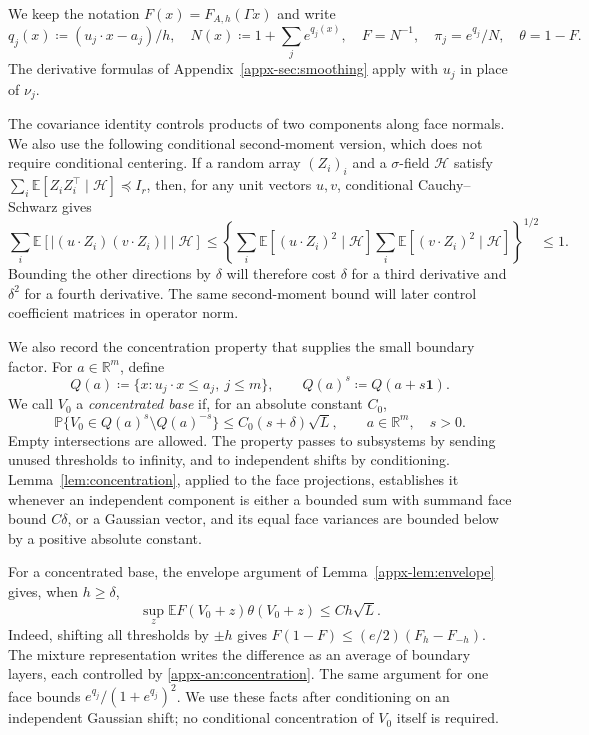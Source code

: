 \documentclass[11pt,letterpaper]{article}
\theoremstyle{remark}
\newcommand{\E}{\mathbb E}
\newcommand{\Pp}{\mathbb P}
\newcommand{\R}{\mathbb R}
\begin{document}
We keep the notation \(F(x)=F_{A,h}(\Gamma x)\) and write
\[
 q_j(x)\coloneqq (u_j\cdot x-a_j)/h,\quad N(x)\coloneqq 1+\sum_j e^{q_j(x)},\quad
 F=N^{-1},\quad \pi_j=e^{q_j}/N,\quad\theta=1-F.
\]
The derivative formulas of Appendix~\ref{appx-sec:smoothing} apply
with \(u_j\) in place of \(\nu_j\).

The covariance identity controls products of two components along face normals.
We also use the following conditional second-moment version, which
does not require conditional centering. If a random array \((Z_i)_i\)
and a \(\sigma\)-field \(\mathcal H\) satisfy
\(\sum_i\E[Z_iZ_i^\top\mid\mathcal H]\preceq I_r\), then, for
any unit vectors \(u,v\), conditional Cauchy--Schwarz gives
\begin{equation}
 \sum_i\E[|(u\cdot Z_i)(v\cdot Z_i)|\mid\mathcal H]
 \le\left\{\sum_i\E[(u\cdot Z_i)^2\mid\mathcal H]
           \sum_i\E[(v\cdot Z_i)^2\mid\mathcal H]\right\}^{1/2}
 \le1.
 \label{appx-an:pair-contraction}
\end{equation}
Bounding the other directions by \(\delta\) will therefore cost
\(\delta\) for a third derivative and \(\delta^2\) for a fourth
derivative. The same second-moment bound will later control coefficient
matrices in operator norm.

We also record the concentration property that supplies the small
boundary factor. For \(a\in\R^m\), define
\[
 Q(a)\coloneqq \{x:u_j\cdot x\le a_j,\ j\le m\},\qquad
 Q(a)^s\coloneqq Q(a+s\mathbf1).
\]
We call \(V_0\) a \emph{concentrated base} if, for an absolute
constant \(C_0\),
\begin{equation}
 \Pp\{V_0\in Q(a)^s\setminus Q(a)^{-s}\}
 \le C_0(s+\delta)\sqrt L,
 \qquad a\in\R^m,\quad s>0.
 \label{appx-an:concentration}
\end{equation}
Empty intersections are allowed. The property passes to subsystems
by sending unused thresholds to infinity, and to independent shifts
by conditioning. Lemma~\ref{lem:concentration}, applied to the face
projections, establishes it whenever an independent component is
either a bounded sum with summand face bound \(C\delta\), or a
Gaussian vector, and its equal face variances are bounded below by
a positive absolute constant.

For a concentrated base, the envelope argument of
Lemma~\ref{appx-lem:envelope} gives, when \(h\ge\delta\),
\begin{equation}
 \sup_z\E F(V_0+z)\theta(V_0+z)\le Ch\sqrt L.
 \label{appx-an:weight-concentration}
\end{equation}
Indeed, shifting all thresholds by \(\pm h\) gives
\(F(1-F)\le(e/2)(F_h-F_{-h})\). The mixture representation writes
the difference as an average of boundary layers, each controlled by
\eqref{appx-an:concentration}. The same argument for one face bounds
\(e^{q_j}/(1+e^{q_j})^2\). We use these facts after conditioning on
an independent Gaussian shift; no conditional concentration of
\(V_0\) itself is required.
\end{document}
